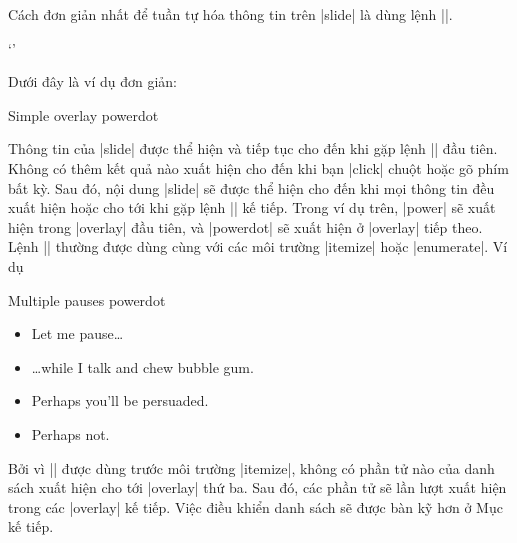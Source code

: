 \DescribeMacro{\pause}
Cách đơn giản nhất để tuần tự hóa thông tin trên |slide|
là dùng lệnh |\pause|.
\begin{command}
 `'
\end{command}
Dưới đây là ví dụ đơn giản:
\begin{example}
 \begin{slide}{Simple overlay}
   power\pause dot
 \end{slide}
\end{example}
Thông tin của |slide| được thể hiện và tiếp tục cho đến khi gặp lệnh |\pause|
đầu tiên. Không có thêm kết quả nào xuất hiện cho đến khi bạn |click|
chuột hoặc gõ phím bất kỳ. Sau đó, nội dung |slide| sẽ được thể hiện
cho đến khi mọi thông tin đều xuất hiện hoặc cho tới khi gặp lệnh |\pause|
kế tiếp. Trong ví dụ trên, |power| sẽ xuất hiện trong |overlay| đầu tiên,
và |powerdot| sẽ xuất hiện ở |overlay| tiếp theo. Lệnh |\pause| thường được
dùng cùng với các môi trường |itemize| hoặc |enumerate|. Ví dụ
\begin{example}
 \begin{slide}{Multiple pauses}
   power\pause dot \pause
   \begin{itemize}
     \item Let me pause\ldots \pause
     \item \ldots while I talk \pause and chew bubble gum. \pause
     \item Perhaps you'll be persuaded.
     \item Perhaps not.
   \end{itemize}
 \end{slide}
\end{example}
Bởi vì |\pause| được dùng trước môi trường |itemize|, không có
phần tử nào của danh sách xuất hiện cho tới |overlay| thứ ba.
Sau đó, các phần tử sẽ lần lượt xuất hiện trong các |overlay|
kế tiếp. Việc điều khiển danh sách sẽ được bàn kỹ hơn ở Mục kế tiếp.

